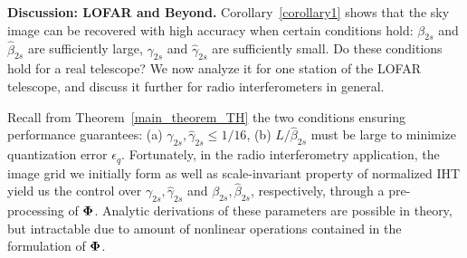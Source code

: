 \documentclass{article}
\begin{document}
{\bf Discussion: LOFAR and Beyond.}
Corollary~\ref{corollary1} shows that the sky image 
can be recovered with high accuracy when certain conditions  hold:
${\beta}_{2s}$ and $\hat{\beta}_{2s}$ are sufficiently large, ${\gamma}_{2s}$ and $\hat{\gamma}_{2s}$
are sufficiently small. Do these conditions hold for a real telescope? We now analyze it for one station of the LOFAR telescope, and discuss it further for radio interferometers in general.

 Recall from Theorem~\ref{main_theorem_TH} the two conditions ensuring  performance guarantees: (a) $\gamma_{2s}, \hat{\gamma}_{2s} \leq 1/16$, (b) ${L}/{\hat{\beta}_{2s}}$ must be large to minimize quantization error $ {\epsilon}_q$. Fortunately, in the radio interferometry application, the image grid we initially form as well as scale-invariant property of normalized IHT yield us the control over $\gamma_{2s}, \hat{\gamma}_{2s}$ and ${\beta}_{2s}, \hat{\beta}_{2s}$, respectively, through a pre-processing of ${\bf \Phi}$. Analytic derivations of these parameters are possible in theory, but intractable due to amount of nonlinear operations contained in the formulation of ${\bf \Phi}$. 
\end{document}
